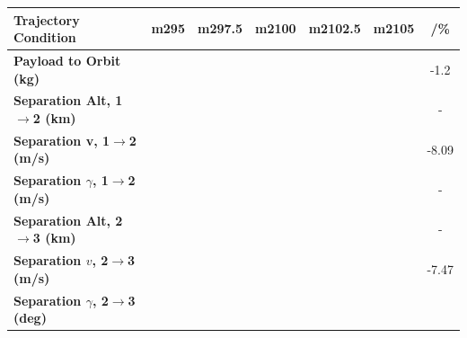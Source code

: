 \begin{table}[ht]
\centering
\begin{tabular}{l c c c c c c} 
	\hline \textbf{Trajectory Condition}
	&m295
	&m297.5
	&m2100
	&m2102.5
	&m2105
	& /\%
	\\
	\hline \textbf{Payload to Orbit (kg)}
	& \PayloadToOrbitmSPARTANNinetyFive
	& \PayloadToOrbitmSPARTANNinetySevenFive
	& \PayloadToOrbitmSPARTANStandard
	& \PayloadToOrbitmSPARTANOneHundredTwoFive
	& \PayloadToOrbitmSPARTANOneHundredFive
	&-1.2
	\\
	\textbf{Separation Alt, 1$\rightarrow$2 (km)}
	& \firstsecondSeparationAltmSPARTANNinetyFive
	& \firstsecondSeparationAltmSPARTANNinetySevenFive
	& \firstsecondSeparationAltmSPARTANStandard
	& \firstsecondSeparationAltmSPARTANOneHundredTwoFive
	& \firstsecondSeparationAltmSPARTANOneHundredFive
	& -
	\\
	\textbf{Separation v, 1$\rightarrow$2 (m/s)}
	& \firstsecondSeparationvmSPARTANNinetyFive
	& \firstsecondSeparationvmSPARTANNinetySevenFive
	& \firstsecondSeparationvmSPARTANStandard
	& \firstsecondSeparationvmSPARTANOneHundredTwoFive
	& \firstsecondSeparationvmSPARTANOneHundredFive
	&-8.09
	\\
	\textbf{Separation $\gamma$, 1$\rightarrow$2 (m/s)}
	& \firstsecondSeparationgammamSPARTANNinetyFive
	& \firstsecondSeparationgammamSPARTANNinetySevenFive
	& \firstsecondSeparationgammamSPARTANStandard
	& \firstsecondSeparationgammamSPARTANOneHundredTwoFive
	& \firstsecondSeparationgammamSPARTANOneHundredFive
	& -
	\\
	\textbf{Separation Alt, 2$\rightarrow$3 (km)}
	& \secondthirdSeparationAltmSPARTANNinetyFive
	& \secondthirdSeparationAltmSPARTANNinetySevenFive
	& \secondthirdSeparationAltmSPARTANStandard
	& \secondthirdSeparationAltmSPARTANOneHundredTwoFive
	& \secondthirdSeparationAltmSPARTANOneHundredFive
	& -
	\\
	\textbf{Separation $v$, 2$\rightarrow$3 (m/s)}
	& \secondthirdSeparationvmSPARTANNinetyFive
	& \secondthirdSeparationvmSPARTANNinetySevenFive
	& \secondthirdSeparationvmSPARTANStandard
	& \secondthirdSeparationvmSPARTANOneHundredTwoFive
	& \secondthirdSeparationvmSPARTANOneHundredFive
	&-7.47
	\\
	\textbf{Separation $\gamma$, 2$\rightarrow$3 (deg)}
	& \secondthirdSeparationgammamSPARTANNinetyFive
	& \secondthirdSeparationgammamSPARTANNinetySevenFive
	& \secondthirdSeparationgammamSPARTANStandard
	& \secondthirdSeparationgammamSPARTANOneHundredTwoFive
	& \secondthirdSeparationgammamSPARTANOneHundredFive

\end{tabular}
\end{table}
